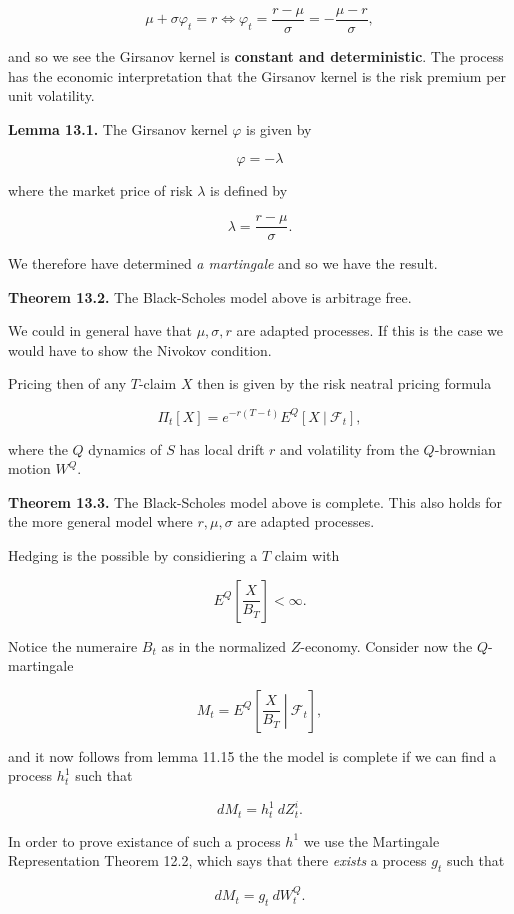 \documentclass[
]{article}
\begin{document}
\[
\mu + \sigma \varphi_t=r\iff \varphi_t=\frac{r-\mu}{\sigma}=-\frac{\mu -r}{\sigma},
\]

and so we see the Girsanov kernel is \textbf{constant and
deterministic}. The process has the economic interpretation that the
Girsanov kernel is the risk premium per unit volatility.

\textbf{Lemma 13.1.} The Girsanov kernel \(\varphi\) is given by

\[
\varphi = -\lambda
\]

where the market price of risk \(\lambda\) is defined by

\[
\lambda =\frac{r-\mu}{\sigma}.
\]

We therefore have determined \emph{a martingale} and so we have the
result.

\textbf{Theorem 13.2.} The Black-Scholes model above is arbitrage free.

We could in general have that \(\mu,\sigma,r\) are adapted processes. If
this is the case we would have to show the Nivokov condition.

Pricing then of any \(T\)-claim \(X\) then is given by the risk neatral
pricing formula

\[
\Pi_t[X]=e^{-r(T-t)}E^Q[X\ \vert\ \mathcal{F}_t],
\]

where the \(Q\) dynamics of \(S\) has local drift \(r\) and volatility
from the \(Q\)-brownian motion \(W^Q\).

\textbf{Theorem 13.3.} The Black-Scholes model above is complete. This
also holds for the more general model where \(r,\mu,\sigma\) are adapted
processes.

Hedging is the possible by considiering a \(T\) claim with

\[
E^Q\left[\frac{X}{B_T}\right]<\infty.
\]

Notice the numeraire \(B_t\) as in the normalized \(Z\)-economy.
Consider now the \(Q\)-martingale

\[
M_t=E^Q\left[\left. \frac{X}{B_T}\ \right\vert\ \mathcal{F}_t\right],
\]

and it now follows from lemma 11.15 the the model is complete if we can
find a process \(h_t^1\) such that

\[
dM_t=h_t^1\ dZ_t^i.
\]

In order to prove existance of such a process \(h^1\) we use the
Martingale Representation Theorem 12.2, which says that there
\emph{exists} a process \(g_t\) such that

\[
dM_t=g_t\ dW_t^Q.
\]
\end{document}
